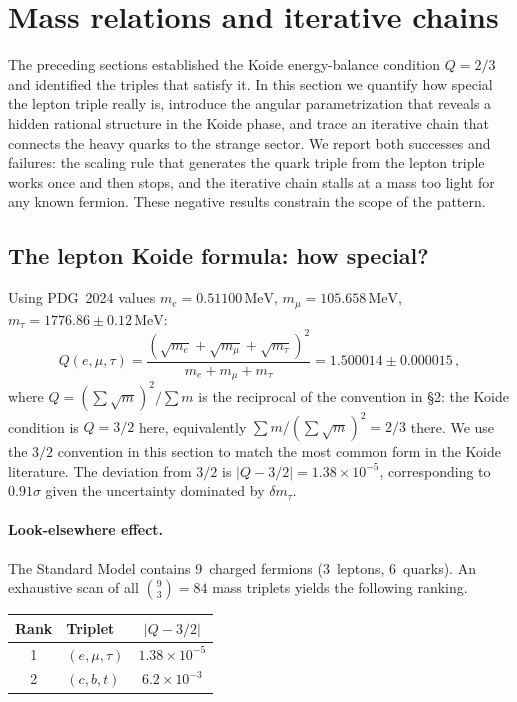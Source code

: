 \documentclass[12pt,a4paper]{article}
\newcommand{\MeV}{\,\text{MeV}}
\begin{document}
\section{Mass relations and iterative chains}
\label{sec:chains}

The preceding sections established the Koide energy-balance condition
$Q = 2/3$ and identified the triples that satisfy it. In this section
we quantify how special the lepton triple really is, introduce the
angular parametrization that reveals a hidden rational structure in
the Koide phase, and trace an iterative chain that connects the heavy
quarks to the strange sector. We report both successes and failures:
the scaling rule that generates the quark triple from the lepton
triple works once and then stops, and the iterative chain stalls at
a mass too light for any known fermion. These negative results
constrain the scope of the pattern.

\subsection{The lepton Koide formula: how special?}
Using PDG~2024 values $m_e = 0.51100\MeV$, $m_\mu = 105.658\MeV$,
$m_\tau = 1776.86 \pm 0.12\MeV$:
\begin{equation}
Q(e,\mu,\tau) = \frac{(\sqrt{m_e} + \sqrt{m_\mu} + \sqrt{m_\tau})^2}
{m_e + m_\mu + m_\tau} = 1.500014 \pm 0.000015\,,
\end{equation}
where $Q = (\sum\sqrt{m})^2 / \sum m$ is the reciprocal of the
convention in \S2: the Koide condition is
$Q = 3/2$ here, equivalently $\sum m / (\sum\sqrt{m})^2 = 2/3$
there. We use the $3/2$ convention in this section to match
the most common form in the Koide literature.
The deviation from $3/2$ is $|Q - 3/2| = 1.38 \times 10^{-5}$,
corresponding to $0.91\sigma$ given the uncertainty dominated by
$\delta m_\tau$.

\paragraph{Look-elsewhere effect.}
The Standard Model contains 9~charged fermions (3~leptons, 6~quarks).
An exhaustive scan of all $\binom{9}{3} = 84$ mass triplets yields
the following ranking.

\begin{center}
\begin{tabular}{clc}
\toprule
Rank & Triplet & $|Q - 3/2|$ \\
\midrule
1 & $(e, \mu, \tau)$ & $1.38 \times 10^{-5}$ \\
2 & $(c, b, t)$ & $6.2 \times 10^{-3}$ \\
\bottomrule
\end{tabular}
\end{center}
\end{document}
